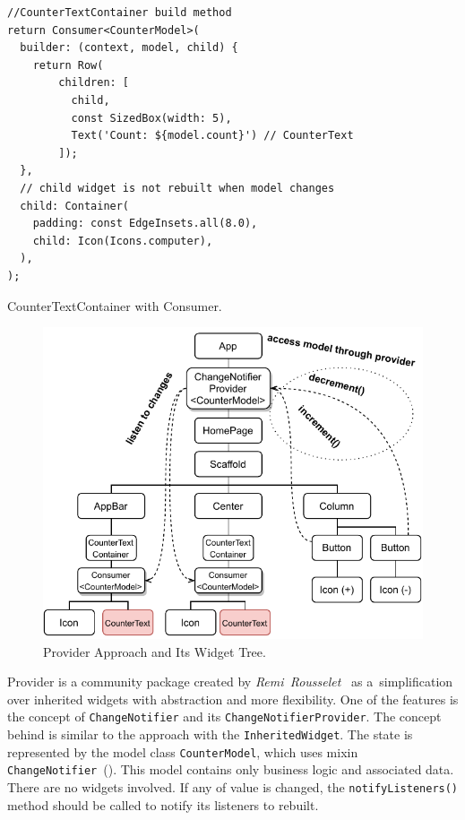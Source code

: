 \begin{listing}[ht]
\begin{verbatim}
//CounterTextContainer build method
return Consumer<CounterModel>(
  builder: (context, model, child) {
    return Row(
        children: [
          child,
          const SizedBox(width: 5),
          Text('Count: ${model.count}') // CounterText
        ]);
  },
  // child widget is not rebuilt when model changes
  child: Container(
    padding: const EdgeInsets.all(8.0),
    child: Icon(Icons.computer),
  ),
);
\end{verbatim}
\caption{CounterTextContainer with Consumer.}
\label{listing:counter-provider-consumer}
\end{listing}

\begin{figure}[ht]
    \centering
    \includegraphics[width=0.75\linewidth]{img/flutter/counter-provider.pdf}
    \caption{Provider Approach and Its Widget Tree.}
    \label{fig:counter-app-provider}
\end{figure}

Provider is a community package created by \textit{Remi~Rousselet}~\cite{package-provider} as a~simplification over inherited widgets with abstraction and more flexibility. One of the features is the concept of \verb|ChangeNotifier| and its \verb|ChangeNotifierProvider|. The concept behind is similar to the approach with the \verb|InheritedWidget|. The state is represented by the model class \verb|CounterModel|, which uses mixin \verb|ChangeNotifier|~(). This model contains only business logic and associated data. There are no widgets involved. If any of value is changed, the \verb|notifyListeners()| method should be called to notify its listeners to rebuilt.

